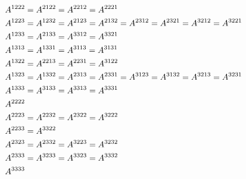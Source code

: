 \begin{align*}
A^{1222} & = A^{2122} = A^{2212} = A^{2221}
\\
A^{1223} & = A^{1232} = A^{2123} = A^{2132} = A^{2312} = A^{2321} = A^{3212} = A^{3221}
\\
A^{1233} & = A^{2133} = A^{3312} = A^{3321}
\\
A^{1313} & = A^{1331} = A^{31\hspace{-0.1ex}13} = A^{3131}
\\
A^{1322} & = A^{2213} = A^{2231} = A^{3122}
\\
A^{1323} & = A^{1332} = A^{2313} = A^{2331} = A^{3123} = A^{3132} = A^{3213} = A^{3231}
\\
A^{1333} & = A^{3133} = A^{3313} = A^{3331}
\\
A^{2222} &
\\
A^{2223} & = A^{2232} = A^{2322} = A^{3222}
\\
A^{2233} & = A^{3322}
\\
A^{2323} & = A^{2332} = A^{3223} = A^{3232}
\\
A^{2333} & = A^{3233} = A^{3323} = A^{3332}
\\
A^{3333} &
\vspace{-1em}\end{align*}

\endgroup

